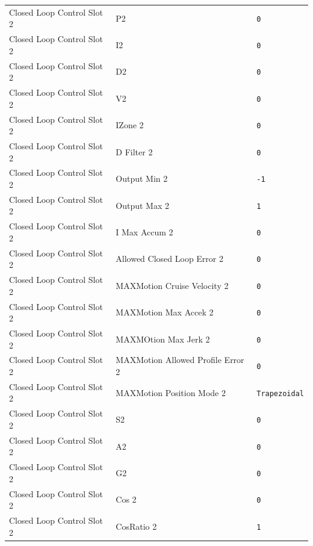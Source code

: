 \begin{longtable}{p{3.5cm} p{8cm} p{3cm}}
Closed Loop Control Slot 2 & P2 & \texttt{0} \\
Closed Loop Control Slot 2 & I2 & \texttt{0} \\
Closed Loop Control Slot 2 & D2 & \texttt{0} \\
Closed Loop Control Slot 2 & V2 & \texttt{0} \\
Closed Loop Control Slot 2 & IZone 2 & \texttt{0} \\
Closed Loop Control Slot 2 & D Filter 2 & \texttt{0} \\
Closed Loop Control Slot 2 & Output Min 2 & \texttt{-1} \\
Closed Loop Control Slot 2 & Output Max 2 & \texttt{1} \\
Closed Loop Control Slot 2 & I Max Accum 2 & \texttt{0} \\
Closed Loop Control Slot 2 & Allowed Closed Loop Error 2 & \texttt{0} \\
Closed Loop Control Slot 2 & MAXMotion Cruise Velocity 2 & \texttt{0} \\
Closed Loop Control Slot 2 & MAXMotion Max Accek 2 & \texttt{0} \\
Closed Loop Control Slot 2 & MAXMOtion Max Jerk 2 & \texttt{0} \\
Closed Loop Control Slot 2 & MAXMotion Allowed Profile Error 2 & \texttt{0} \\
Closed Loop Control Slot 2 & MAXMotion Position Mode 2 & \texttt{Trapezoidal} \\
Closed Loop Control Slot 2 & S2 & \texttt{0} \\
Closed Loop Control Slot 2 & A2 & \texttt{0} \\
Closed Loop Control Slot 2 & G2 & \texttt{0} \\
Closed Loop Control Slot 2 & Cos 2 & \texttt{0} \\
Closed Loop Control Slot 2 & CosRatio 2 & \texttt{1} \\


\end{longtable}
